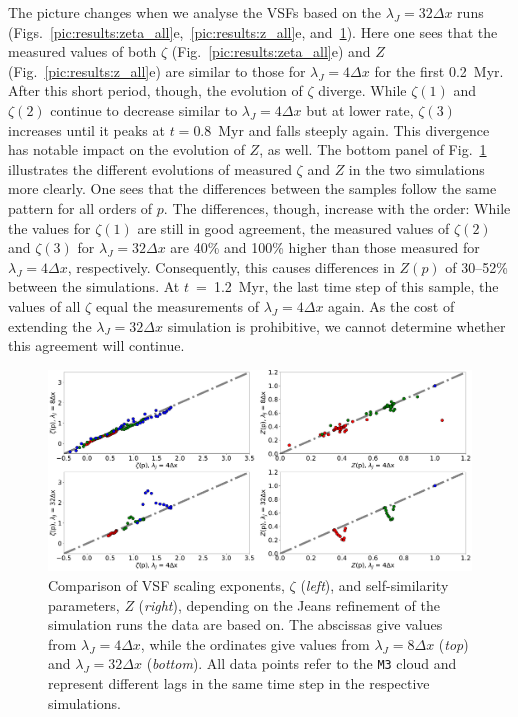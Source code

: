 \documentclass{aa}		%
\begin{document}
The picture changes when we analyse the VSFs based on the $\lambda_J = 32\Delta{}x$ runs (Figs.~\ref{pic:results:zeta_all}e,~\ref{pic:results:z_all}e, and~\ref{pic:results:jeans_comp}).
Here one sees that the measured values of both $\zeta$ (Fig.~\ref{pic:results:zeta_all}e) and $Z$ (Fig.~\ref{pic:results:z_all}e) are similar to those for $\lambda_J = 4\Delta{}x$ for the first 0.2~Myr.
After this short period, though, the evolution of $\zeta$ diverge. 
While $\zeta(1)$ and $\zeta(2)$ continue to decrease similar to $\lambda_J = 4\Delta{}x$ but at lower rate, $\zeta(3)$ increases until it peaks at $t=0.8$~Myr and falls steeply again.
This divergence has notable impact on the evolution of $Z$, as well. 
The bottom panel of Fig.~\ref{pic:results:jeans_comp} illustrates the different evolutions of measured $\zeta$ and $Z$ in the two simulations more clearly.
One sees that the differences between the samples follow the same pattern for all orders of $p$.
The differences, though, increase with the order:
While the values for $\zeta(1)$ are still in good agreement, the measured values of $\zeta(2)$ and $\zeta(3)$ for $\lambda_J = 32\Delta{}x$ are 40\% and 100\% higher than those measured for $\lambda_J = 4\Delta{}x$, respectively.
Consequently, this causes differences in $Z(p)$ of 30--52\% between the simulations.
At $t$~=~1.2~Myr, the last time step of this sample, the values of all $\zeta$ equal the measurements of $\lambda_J = 4\Delta{}x$ again.
As the cost of extending the $\lambda_J = 32\Delta{}x$ simulation is prohibitive, we cannot determine whether this agreement will continue.

\begin{figure}
	\centering
    \includegraphics[width=\textwidth]{comp_jeans.pdf}
    \caption{Comparison of VSF scaling exponents, $\zeta$ (\textit{left}), and self-similarity parameters, $Z$ (\textit{right}), depending on the Jeans refinement of the simulation runs the data are based on. The abscissas give values from $\lambda_J = 4\Delta{}x$, while the ordinates give values from $\lambda_J = 8\Delta{}x$ (\textit{top}) and $\lambda_J = 32\Delta{}x$ (\textit{bottom}). All data points refer to the \texttt{M3} cloud and represent different lags in the same time step in the respective simulations. 
    }
    \label{pic:results:jeans_comp}
\end{figure}
\end{document}
